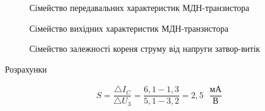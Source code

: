 \documentclass[a4paper,14pt]{extreport}
\begin{document}
\newpage
\clearpage
\begin{figure}[h]
\caption{Сімейство передавальних характеристик МДН-транзистора}
\label{ris1}
\end{figure}

\begin{figure}[h!]
\caption{Сімейство вихідних характеристик МДН-транзистора}
\label{ris1}
\end{figure}
\begin{figure}[h]
\caption{Сімейство залежності кореня струму від напруги затвор-витік}
\label{ris1}
\end{figure}
\newpage
  \begin{center}Розрахунки\end{center}
\begin{align}\label{q1}
  S = \dfrac{\triangle I_C}{\triangle U_{\text{3}}} = \dfrac{6,1-1,3}{5,1-3,2}=2,5 \text{ }\dfrac{\text{мА}}{\text{В}}
\end{align}
\end{document}
